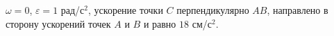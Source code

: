 $\omega=0$, $\varepsilon=1$ рад/с$^2$, ускорение точки $C$
перпендикулярно $AB$, направлено в сторону ускорений точек $A$ и $B$
и равно $18$ см/с$^2$.
